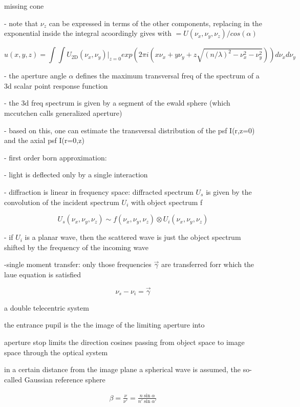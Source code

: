 missing cone \cite{Streibl1984}


- note that $\nu_z$ can be expressed in terms of the other components,
  replacing in the exponential inside the integral acoordingly gives
  with $= U(\nu_x,\nu_y,\nu_z)/cos(\alpha)$

$$ u(x,y,z)=\int\int U_\textrm{2D}(\nu_x,\nu_y)|_{z=0}  exp(2\pi i (x \nu_x+y\nu_y+z\sqrt{(n/\lambda)^2-\nu_x^2-\nu_y^2})) d \nu_x d \nu_y$$

- the aperture angle $\alpha$ defines the maximum transversal freq of
   the spectrum of a 3d scalar point response function

- the 3d freq spectrum is given by a segment of the ewald sphere
  (which mccutchen calls generalized aperture)

- based on this, one can estimate the transversal distribution of the
  psf I(r,z=0) and the axial psf I(r=0,z)

- first order born approximation:

    - light is deflected only by a single interaction 

    - diffraction is linear in frequency space: diffracted spectrum $U_s$ is
      given by the convolution of the incident spectrum $U_i$ with object
      spectrum f

$$U_s(\nu_x,\nu_y,\nu_z) \sim f(\nu_x,\nu_y,\nu_z) \otimes U_i(\nu_x,\nu_y,\nu_z)$$

    - if $U_i$ is a planar wave, then the scattered wave is just the
      object spectrum shifted by the frequency of the incoming wave

    -single moment transfer: only those frequencies $\vec\gamma$ are
     transferred forr which the laue equation is satisfied

$$\nu_s-\nu_i=\vec\gamma$$





a double telecentric system



the entrance pupil is the the image of the limiting aperture into 

aperture stop limits the direction cosines passing from object space
to image space through the optical system

in a certain distance from the image plane a spherical wave is assumed,
the so-called Gaussian reference sphere


\begin{align}
  \beta = \frac{\nu}{\nu'}=\frac{n\sin\alpha}{n'\sin\alpha'}
\end{align} %

